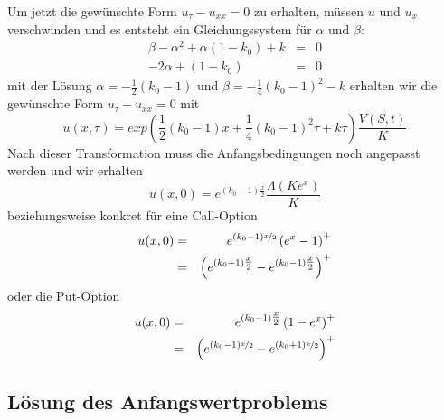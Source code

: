 Um jetzt die gewünschte Form $u_{\tau} - u_{xx} = 0$ zu erhalten, müssen $u$ und $u_x$ verschwinden und es entsteht ein Gleichungssystem für $\alpha$ und $\beta$:
\begin{eqnarray*}
\beta - \alpha^2 + \alpha\left(1-k_0\right) + k & = & 0 \\
-2\alpha + \left(1-k_0\right) & = & 0
\end{eqnarray*}
mit der Lösung $\alpha = -\frac{1}{2}\left(k_0-1\right)$ und $\beta = -\frac{1}{4}\left(k_0-1\right)^2 - k$ erhalten wir die gewünschte Form $u_{\tau} - u_{xx} = 0$ mit
\begin{equation}
u\left(x,\tau\right) = exp\left(\frac{1}{2}\left(k_0-1\right)x + \frac{1}{4}\left(k_0-1\right)^2\tau + k\tau\right)\frac{V(S,t)}{K}
\end{equation}
Nach dieser Transformation muss die Anfangsbedingungen noch angepasst werden und wir erhalten
\begin{equation}
u(x,0) = e^{\left(k_0-1\right)\tfrac{x}{2}}\frac{\Lambda\left(Ke^x\right)}{K}
\end{equation}
beziehungsweise konkret für eine Call-Option
\begin{eqnarray} 
u(x,0) & = & e^{\left(k_0-1\right)\nicefrac{x}{2}}\left(e^x - 1\right)^+ \nonumber \\
       & = & \left(e^{\left(k_0 + 1\right)\tfrac{x}{2}} - e^{\left(k_0-1\right)\tfrac{x}{2}}\right)^+ \label{BS:AnfangswertCall}
\end{eqnarray}
oder die Put-Option
\begin{eqnarray} 
u(x,0) & = & e^{\left(k_0-1\right)\tfrac{x}{2}}\left(1-e^x\right)^+ \nonumber \\
       & = & \left(e^{\left(k_0-1\right)\nicefrac{x}{2}} - e^{\left(k_0 + 1\right)\nicefrac{x}{2}}\right)^+
\end{eqnarray}

\subsection{Lösung des Anfangswertproblems}                  %
\label{cha:LoesungWaermeleitungsgleichung}                   %

